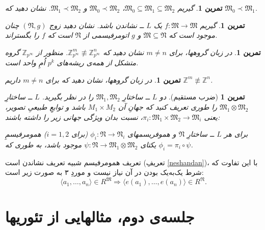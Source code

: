 \documentclass[12pt,a4paper]{article}
\theoremstyle{colorhead}
\newtheorem{tam}[thm]{تمرین}
\begin{document}
\begin{tam}

گیریم 
$\mathfrak{M}_0\subseteq \mathfrak{M}_1\subseteq \mathfrak{M}_2$،
$\mathfrak{M}_0\prec \mathfrak{M}_2$
و
$\mathfrak{M}_1\prec \mathfrak{M}_2$.
نشان دهید که
$\mathfrak{M}_0\prec \mathfrak{M}_1$.
\end{tam}
\begin{tam}
گیریم
$f:\mathfrak{M}\to \mathfrak{M}$
یک 
$L$ ــ
نشاندن باشد. نشان دهید 
زوج 
$(\mathfrak{N},g)$
چنان موجود است که
$\mathfrak{M}\subseteq \mathfrak{N}$
و
$g$
اتومرفیسمی از
$\mathfrak{N}$
است که
$f$
را بگستراند.
\end{tam}

\begin{tam}
در زبان گروهها،
برای
$m\not=n$
نشان دهید که
$\mathbb{Z}^m_{p^\infty }\not\equiv \mathbb{Z}^n_{p^\infty }$.
منظور از
$\mathbb{Z}_{p^\infty }$
گروه متشکل از همه‌ی ریشه‌های
$p^k$
اُمِ واحد است.
\end{tam}
\begin{tam}
در زبان گروهها، نشان دهید که برای
$m\not=n$
داریم
$\mathbb{Z}^m\not\equiv\mathbb{Z}^n$.
\end{tam}
\begin{tam}[ضرب مستقیم]
دو
$L$ ــ
ساختارِ
$\mathfrak{M}_1,\mathfrak{M}_2$
را در نظر بگیرید. 
$L$
ــ ساختارِ
$\mathfrak{M}_1\otimes \mathfrak{M}_2$
را طوری تعریف کنید که جهانِ آن
$M_1\times M_2$
باشد و توابعِ طبیعیِ تصویر، یعنی
$\pi_i:\mathfrak{M}_1\times \mathfrak{M}_2\to \mathfrak{M}_i$،
نسبت بدان
ویژگی جهانی زیر را داشته باشند:
\par 
برای هر
$L$ ــ
ساختارِ
$\mathfrak{N}$
و هموفریسمهای
$\phi_i:\mathfrak{N}\to \mathfrak{N}_i$
(برای
$i=1,2$)
همومرفیسمِ یکتای
$\psi:\mathfrak{N}\to \mathfrak{M}_1\otimes \mathfrak{M}_2$
موجود باشد، به طوری که
$\phi_i=\pi_i\circ \psi$.
\end{tam}
تعریف همومرفیسم شبیه تعریف نشاندن است (تعریفِ
\ref{neshandan})،‌
 با این تفاوت که شرط یک‌به‌یک بودن در آن نیاز نیست و 
موردِ ۳ به صورت زیر است: 
\[
\langle a_1,\ldots,a_n\rangle\in R^\mathfrak{M} \Rightarrow 
\langle e(a_1),\ldots,e(a_n)\rangle\in R^\mathfrak{N}.
\]
\pagebreak
\section{ جلسه‌ی دوم، مثالهایی از تئوریها}
\end{document}
